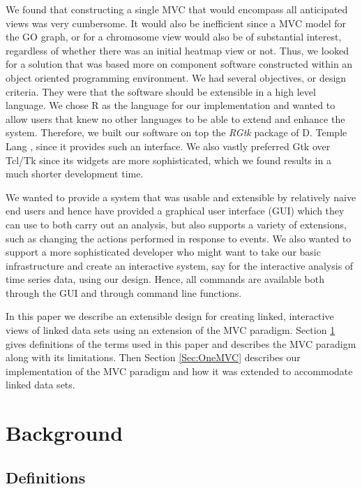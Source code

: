 \documentclass[11pt]{article}
\newcommand{\Rpackage}[1]{{\textit{#1}}}
\begin{document}
We found that constructing a single MVC that would encompass all
anticipated views was very cumbersome. It would also be inefficient
since a MVC model for the GO graph, or for a chromosome view would
also be of substantial interest, regardless of whether there was an
initial heatmap view or not. Thus, we looked for a solution that was
based more on component software constructed within an object oriented
programming environment.
We had several objectives, or design criteria. They were that the
software should be extensible in a high level language. We chose R as
the language for our implementation and wanted to allow users that
knew no other languages to be able to extend and enhance the
system. Therefore, we built our software on top the \Rpackage{RGtk} package of
D. Temple Lang \cite{RGtk}, since it provides such an interface. We also vastly
preferred Gtk over Tcl/Tk since its widgets are more sophisticated,
which we found results in a much shorter development time.

We wanted to provide a system that was usable and extensible by
relatively naive end users and hence have provided a graphical user
interface (GUI) which they can use to both carry out an analysis, but
also supports a variety of extensions, such as changing the actions
performed in response to events. We also wanted to support a more
sophisticated developer who might want to take our basic infrastructure
and create an interactive system, say for the interactive analysis of
time series data, using our design. Hence, all commands are
available both through the GUI and through command line functions.

In this paper we describe an extensible design for creating linked,
interactive views of linked data sets using an extension of the MVC 
paradigm.  Section \ref{Sec:Back} gives definitions of the terms used in this
paper and describes the MVC paradigm along with its
limitations.  Then Section \ref{Sec:OneMVC} describes our implementation of
the MVC paradigm and how it was extended to accommodate linked data sets.

\section{Background}
\label{Sec:Back}

\subsection{Definitions}
\label{Ssec:Def}
\end{document}
